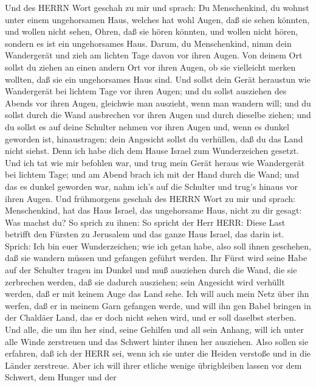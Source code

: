  Und des HERRN Wort geschah zu mir und sprach: 
Du Menschenkind, du wohnst unter einem ungehorsamen Haus, welches hat
wohl Augen, daß sie sehen könnten, und wollen nicht sehen, Ohren, daß
sie hören könnten, und wollen nicht hören, sondern es ist ein
ungehorsames Haus.  Darum, du Menschenkind, nimm dein
Wandergerät und zieh am lichten Tage davon vor ihren Augen. Von deinem
Ort sollst du ziehen an einen andern Ort vor ihren Augen, ob sie
vielleicht merken wollten, daß sie ein ungehorsames Haus sind.
 Und sollst dein Gerät heraustun wie Wandergerät bei lichtem
Tage vor ihren Augen; und du sollst ausziehen des Abends vor ihren
Augen, gleichwie man auszieht, wenn man wandern will;  und
du sollst durch die Wand ausbrechen vor ihren Augen und durch dieselbe
ziehen;  und du sollst es auf deine Schulter nehmen vor
ihren Augen und, wenn es dunkel geworden ist, hinaustragen; dein
Angesicht sollst du verhüllen, daß du das Land nicht siehst. Denn ich
habe dich dem Hause Israel zum Wunderzeichen gesetzt.  Und
ich tat wie mir befohlen war, und trug mein Gerät heraus wie Wandergerät
bei lichtem Tage; und am Abend brach ich mit der Hand durch die Wand;
und das es dunkel geworden war, nahm ich's auf die Schulter und trug's
hinaus vor ihren Augen.  Und frühmorgens geschah des HERRN
Wort zu mir und sprach:  Menschenkind, hat das Haus Israel,
das ungehorsame Haus, nicht zu dir gesagt: Was machst du? 
So sprich zu ihnen: So spricht der Herr HERR: Diese Last betrifft den
Fürsten zu Jerusalem und das ganze Haus Israel, das darin ist.
 Sprich: Ich bin euer Wunderzeichen; wie ich getan habe,
also soll ihnen geschehen, daß sie wandern müssen und gefangen geführt
werden.  Ihr Fürst wird seine Habe auf der Schulter tragen
im Dunkel und muß ausziehen durch die Wand, die sie zerbrechen werden,
daß sie dadurch ausziehen; sein Angesicht wird verhüllt werden, daß er
mit keinem Auge das Land sehe.  Ich will auch mein Netz
über ihn werfen, daß er in meinem Garn gefangen werde, und will ihn gen
Babel bringen in der Chaldäer Land, das er doch nicht sehen wird, und er
soll daselbst sterben.  Und alle, die um ihn her sind,
seine Gehilfen und all sein Anhang, will ich unter alle Winde zerstreuen
und das Schwert hinter ihnen her ausziehen.  Also sollen
sie erfahren, daß ich der HERR sei, wenn ich sie unter die Heiden
verstoße und in die Länder zerstreue.  Aber ich will ihrer
etliche wenige übrigbleiben lassen vor dem Schwert, dem Hunger und der
